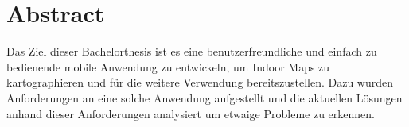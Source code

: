 \chapter*{Abstract}
Das Ziel dieser Bachelorthesis ist es eine benutzerfreundliche und einfach zu bedienende mobile Anwendung zu entwickeln, um Indoor Maps zu kartographieren und für die weitere Verwendung bereitszustellen. Dazu wurden Anforderungen an eine solche Anwendung aufgestellt und die aktuellen Lösungen anhand dieser Anforderungen analysiert um etwaige Probleme zu erkennen.
\clearpage
